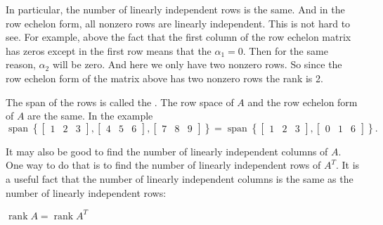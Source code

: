 In particular, the number of linearly independent rows is the same.
And in the row echelon form, all nonzero rows are linearly independent.
This is not hard to see.  For example, above the fact that the first column
of the row echelon matrix has zeros except in the first row means that
the $\alpha_1 = 0$.  Then for the same reason, $\alpha_2$ will be zero.
And here we only have two nonzero rows.
So since the row echelon form of the matrix above has two nonzero rows
the rank is 2.

The span of the rows is called the \emph{}.  The
row space of $A$ and the row echelon form of $A$ are the same.  In the
example
\begin{equation*}
\operatorname{span}
\left\{
\begin{bmatrix}
1 & 2 & 3
\end{bmatrix}
,
\begin{bmatrix}
4 & 5 & 6
\end{bmatrix}
,
\begin{bmatrix}
7 & 8 & 9
\end{bmatrix}
\right\}
=
\operatorname{span}
\left\{
\begin{bmatrix}
1 & 2 & 3
\end{bmatrix}
,
\begin{bmatrix}
0 & 1 & 6
\end{bmatrix}
\right\} .
\end{equation*}

\medskip

It may also be good to find the number of linearly independent columns
of $A$.  One way to do that is to find the number of linearly independent
rows of $A^T$.  It is a useful fact that the number of linearly independent
columns is the same as the number of linearly independent rows:

\begin{theorem}
$\operatorname{rank} A = \operatorname{rank} A^T$
\end{theorem}

